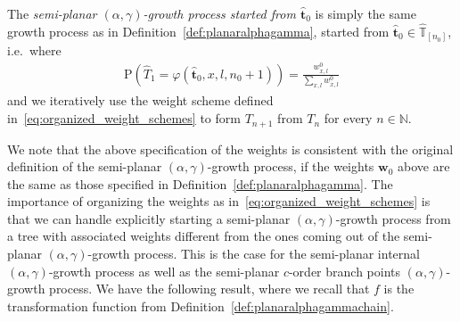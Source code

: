 \documentclass[a4paper, final]{amsart}
\theoremstyle{plain}
\theoremstyle{definition}
\newcommand{\that}[1][t]{\hat{\boldsymbol{#1}}} %
\newcommand{\That}[1][T]{\widehat{#1}}
\newcommand{\Thatspace}[1][\T]{\widehat{\boldsymbol{#1}}} %
\newcommand{\T}{\mathbb{T}}
\newcommand{\nin}{{n \in \mathbb{N}}}
\renewcommand{\P}{\mathrm{P}}
\begin{document}
The \textit{semi-planar $(\alpha, \gamma)$-growth process started from $\that_0$} is simply the same growth process as in Definition~\ref{def:planaralphagamma}, started from $\that_0 \in \Thatspace_{[n_0]}$, i.e.\ where
%
\begin{align}
  \P \left( \That_1 = \varphi \left( \that_0, x, l, n_0 + 1 \right) \right)
  = \frac{w_{x, l}^0}{\sum_{x, l} w_{x, l}^0}
  \label{eq:first_step_generalstart}
\end{align}
%
and we iteratively use the weight scheme defined in~\eqref{eq:organized_weight_schemes} to form $T_{n+1}$ from $T_n$ for every $\nin$.

We note that the above specification of the weights is consistent with the original definition of the semi-planar $(\alpha, \gamma)$-growth process, if the weights $\mathbf{w}_0$ above are the same as those specified in Definition~\ref{def:planaralphagamma}.
The importance of organizing the weights as in~\eqref{eq:organized_weight_schemes} is that we can handle explicitly starting a semi-planar $(\alpha, \gamma)$-growth process from a tree with associated weights different from the ones coming out of the semi-planar $(\alpha, \gamma)$-growth process.
This is the case for the semi-planar internal $(\alpha, \gamma)$-growth process as well as the semi-planar $c$-order branch points $(\alpha, \gamma)$-growth process.
We have the following result, where we recall that $f$ is the transformation function from Definition~\ref{def:planaralphagammachain}.
\end{document}
